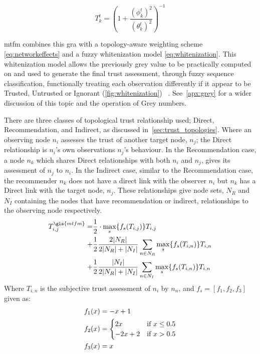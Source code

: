 \begin{equation}
T_k^t = ({1+\frac{(\phi_k^t)^2}{(\theta_k^t)^2}})^{-1} \label{eq:trust_linearisation}
\end{equation}

\gls{mtfm} combines this \gls{gra} with a topology-aware weighting scheme \eqref{eq:networkeffects} and a fuzzy whitenization model \eqref{eq:whitenization}.
This whitenization model allows the previously grey value to be practically computed on and used to generate the final trust assessment, through fuzzy sequence classification, functionally treating each observation differently if it appear to be Trusted, Untrusted or Ignorant (\autoref{fig:whitenization}) ~\cite{Liu2011}.
See~\autoref{apx:grey} for a wider discussion of this topic and the operation of Grey numbers.

There are three classes of topological trust relationship used; Direct, Recommendation, and Indirect, as discussed in~\autoref{sec:trust_topologies}.
Where an observing node $n_i$ assesses the trust of another target node, $n_j$; the Direct relationship is $n_i$'s own observations $n_j$'s behaviour.
In the Recommendation case, a node $n_k$ which shares Direct relationships with both $n_i$ and $n_j$, gives its assessment of $n_j$ to $n_i$.
In the Indirect case, similar to the Recommendation case, the recommender $n_k$ does not have a direct link with the observer $n_i$ but $n_k$ has a Direct link with the target node, $n_j$.
These relationships give node sets, $N_R$ and $N_I$ containing the nodes that have recommendation or indirect, relationships to the observing node respectively.
%
\begin{align}
  \label{eq:networkeffects}
  T_{i,j}^{\gls{mtfm}}=&\frac{1}{2} \cdot \max_s\{f_s(T_{i,j})\} T_{i,j}\\ \notag
  +&\frac{1}{2} \frac{2|N_R| }{2|N_R| + |N_I|}\sum_{n \in N_R} \max_s\{f_s(T_{i,n})\} T_{i,n}\\ \notag
  +&\frac{1}{2} \frac{|N_I| }{2|N_R| + |N_I|}\sum_{n \in N_I} \max_s\{f_s(T_{i,n})\} T_{i,n} 
\end{align}
Where $T_{i,n}$ is the subjective trust assessment of $n_i$ by $n_n$, and $f_s = [ f_1,f_2, f_3]$ given as:
\begin{align}
  \label{eq:whitenization}
  f_1(x)&= -x+1\notag\\
  f_2(x)&= 
  \begin{cases}
    2x & \text{if }x\leq 0.5\\
    -2x+2 & \text{if }x>0.5
  \end{cases}\\
  f_3(x)&= x\notag
\end{align}
%

